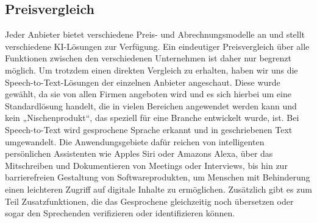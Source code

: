 \subsection{Preisvergleich}
Jeder Anbieter bietet verschiedene Preis- und Abrechnungsmodelle an und stellt verschiedene KI-Lösungen zur Verfügung. Ein eindeutiger Preisvergleich über alle Funktionen zwischen den verschiedenen Unternehmen ist daher nur begrenzt möglich. Um trotzdem einen direkten Vergleich zu erhalten, haben wir uns die Speech-to-Text-Lösungen der einzelnen Anbieter angeschaut. Diese wurde gewählt, da sie von allen Firmen angeboten wird und es sich hierbei um eine Standardlösung handelt, die in vielen Bereichen angewendet werden kann und kein „Nischenprodukt“, das speziell für eine Branche entwickelt wurde, ist. Bei Speech-to-Text wird gesprochene Sprache erkannt und in geschriebenen Text umgewandelt. Die Anwendungsgebiete dafür reichen von intelligenten persönlichen Assistenten wie Apples Siri oder Amazons Alexa, über das Mitschreiben und Dokumentieren von Meetings oder Interviews, bis hin zur barrierefreien Gestaltung von Softwareprodukten, um Menschen mit Behinderung einen leichteren Zugriff auf digitale Inhalte zu ermöglichen. Zusätzlich gibt es zum Teil Zusatzfunktionen, die das Gesprochene gleichzeitig noch übersetzen oder sogar den Sprechenden verifizieren oder identifizieren können. \\

